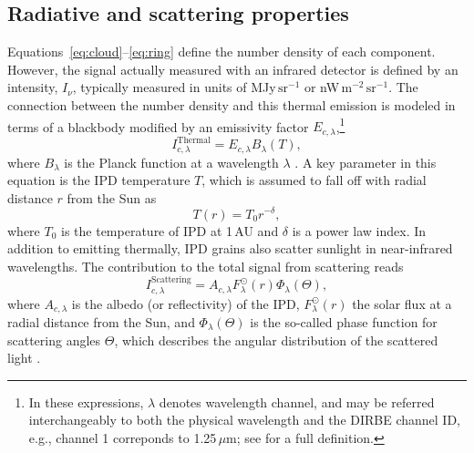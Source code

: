 \documentclass[twocolumn]{aa}
\begin{document}
\subsection{Radiative and scattering properties}
Equations~\eqref{eq:cloud}--\eqref{eq:ring} define the number density
of each component. However, the signal actually measured with an
infrared detector is defined by an intensity, $I_{\nu}$, typically
measured in units of MJy$\,\mathrm{sr}^{-1}$ or
nW$\,\mathrm{m}^{-2}\,\mathrm{sr}^{-1}$. The connection between the
number density and this thermal emission is modeled in terms
of a blackbody modified by an emissivity factor $E_{c,
  \lambda}$,\footnote{In these expressions, $\lambda$ denotes
wavelength channel, and may be referred interchangeably to both the physical
wavelength and the DIRBE channel ID, e.g., channel 1 correponds to
1.25\,$\mu$m; see \citet{hauser1998} for a full definition. }
\begin{equation}
    I^\mathrm{Thermal}_{c,\lambda} = E_{c,\lambda} B_\lambda(T),
\end{equation}
where $B_\lambda$ is the Planck function at a wavelength $\lambda$
\citep{Kelsall1998}. A key parameter in this equation is the IPD
temperature $T$, which is assumed to fall off with radial distance $r$
from the Sun as
\begin{equation}
    T(r) = T_0 r^{-\delta},
\end{equation}
where $T_0$ is the temperature of IPD at 1\,AU and $\delta$ is a power
law index. In addition to emitting thermally, IPD grains also scatter
sunlight in near-infrared wavelengths. The contribution to the total
signal from scattering reads
\begin{equation}\label{eq: scat_term}
    I^\mathrm{Scattering}_{c, \lambda} = A_{c, \lambda} F_\lambda^\odot(r) \Phi_\lambda(\Theta),
\end{equation}
where $A_{c, \lambda}$ is the albedo (or reflectivity) of the IPD,
$F_\lambda^\odot(r)$ the solar flux at a radial distance from the Sun,
and $\Phi_\lambda(\Theta)$ is the so-called phase function for scattering angles
$\Theta$, which describes the angular distribution of the scattered
light \citep{Kelsall1998}.
\end{document}
